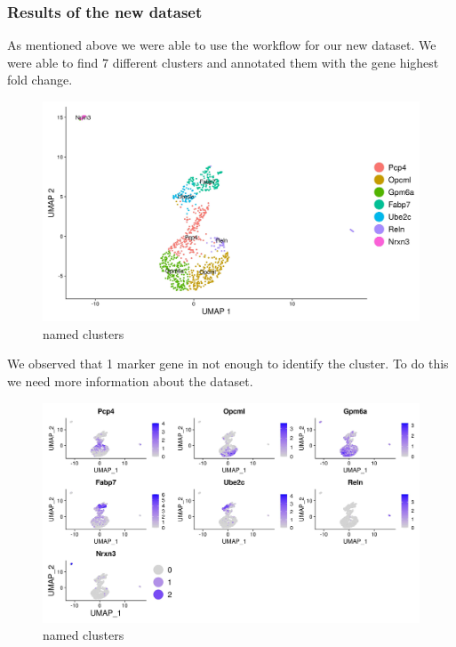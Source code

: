 \hypertarget{results-of-the-new-dataset}{%
\subsubsection{Results of the new
dataset}\label{results-of-the-new-dataset}}

As mentioned above we were able to use the workflow for our new dataset.
We were able to find 7 different clusters and annotated them with the
gene highest fold change.

\begin{figure}
\centering
\includegraphics{output/neurons_900_umap.jpg}
\caption{named clusters}
\end{figure}

We observed that 1 marker gene in not enough to identify the cluster. To
do this we need more information about the dataset.

\begin{figure}
\centering
\includegraphics{output/neurons_900_FeaturePlot.jpg}
\caption{named clusters}
\end{figure}

